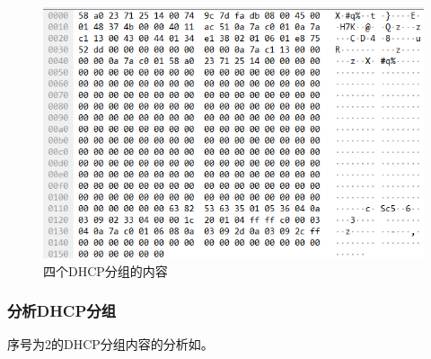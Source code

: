 \documentclass[lang=cn,11pt,a4paper,cite=authornum]{paper}
\begin{document}
\begin{figure}[htbp]
{\begin{minipage}[t]{0.45\linewidth}
            \includegraphics[width=\textwidth]{./Images/DHCP4-2.png}
        \end{minipage}
    }
    \caption{四个DHCP分组的内容\label{fig:dhcp}}

\end{figure}

\subsubsection{分析DHCP分组}

序号为2的DHCP分组内容的分析如。
\end{document}

